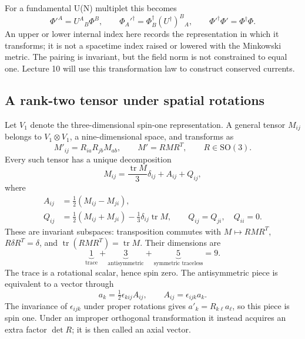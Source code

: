\documentclass[11pt]{article}
\newcommand{\SO}{\mathrm{SO}}
\newcommand{\tr}{\operatorname{tr}}
\begin{document}
For a fundamental U(N) multiplet this becomes
\begin{equation}
 \Phi'^A=U^A{}_B\Phi^B,\qquad
 \Phi_A'^\dagger=\Phi_B^\dagger(U^\dagger)^B{}_A,
 \qquad \Phi'^\dagger\Phi'=\Phi^\dagger\Phi.
 \label{eq:fundamental-dual}
\end{equation}
An upper or lower internal index here records the representation in which
it transforms; it is not a spacetime index raised or lowered with the
Minkowski metric. The pairing is invariant, but the field norm is not
constrained to equal one. Lecture 10 will use this transformation law to
construct conserved currents.

\subsection{A rank-two tensor under spatial rotations}
Let \(V_1\) denote the three-dimensional spin-one representation.
A general tensor \(M_{ij}\) belongs to \(V_1\otimes V_1\), a
nine-dimensional space, and transforms as
\begin{equation}
 M'_{ij}=R_{ia}R_{jb}M_{ab},\qquad M'=RMR^T,
 \qquad R\in\SO(3).
 \label{eq:rank-two-action}
\end{equation}
Every such tensor has a unique decomposition
\begin{equation}
 \boxed{M_{ij}=\frac{\tr M}{3}\delta_{ij}+A_{ij}+Q_{ij}},
 \label{eq:tensor-split}
\end{equation}
where
\begin{align}
 A_{ij}&=\tfrac12(M_{ij}-M_{ji}),\label{eq:antisymmetric-part}\\
 Q_{ij}&=\tfrac12(M_{ij}+M_{ji})-\tfrac13\delta_{ij}\tr M,
 \qquad Q_{ij}=Q_{ji},\quad Q_{ii}=0.
 \label{eq:traceless-part}
\end{align}
These are invariant subspaces: transposition commutes with
\(M\mapsto RMR^T\), \(R\delta R^T=\delta\), and
\(\tr(RMR^T)=\tr M\). Their dimensions are
\[
 \underbrace{1}_{\text{trace}}+
 \underbrace{3}_{\text{antisymmetric}}+
 \underbrace{5}_{\text{symmetric traceless}}=9.
\]
The trace is a rotational scalar, hence spin zero. The antisymmetric
piece is equivalent to a vector through
\begin{equation}
 a_k=\tfrac12\epsilon_{kij}A_{ij},\qquad
 A_{ij}=\epsilon_{ijk}a_k.
 \label{eq:axial-dual}
\end{equation}
The invariance of \(\epsilon_{ijk}\) under proper rotations gives
\(a'_k=R_{k\ell}a_\ell\), so this piece is spin one. Under an improper
orthogonal transformation it instead acquires an extra factor
\(\det R\); it is then called an axial vector.
\end{document}
